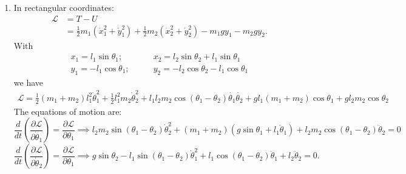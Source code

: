 \documentclass{article}
\theoremstyle{definition}
\newcommand{\p}{\partial}
\newcommand{\lag}{\mathcal{L}}
\newcommand{\f}[2]{\frac{#1}{#2}}
\newcommand{\lp}{\left(}
\newcommand{\rp}{\right)}
\begin{document}
\begin{enumerate}[label=(\alph*)]
	\item In rectangular coordinates:
	\begin{align*}
	\lag 
	&= T - U \\
	&= \f{1}{2}m_1(\dot{x}_1^2 + \dot{y}_1^2) + \f{1}{2}m_2(\dot{x}_2^2 + \dot{y}_2^2) - m_1gy_1 - m_2 g y_2.
	\end{align*}
	With 
	\begin{align*}
	x_1 = l_1 \sin\theta_1; &\quad\quad x_2 = l_2 \sin\theta_2 + l_1 \sin\theta_1 \\
	y_1 = -l_1\cos\theta_1; &\quad\quad y_2 = -l_2\cos\theta_2 - l_1\cos\theta_1
	\end{align*}
	we have
	\begin{align*}
	\boxed{\lag = \f{1}{2}(m_1+m_2) l_1^2\dot{\theta}_1^2  + \f{1}{2}l_1^2m_2\dot{\theta}_2^2 + l_1l_2m_2\cos(\theta_1 - \theta_2) \dot{\theta_1}\dot{\theta_2} + gl_1(m_1+m_2)\cos\theta_1 + gl_2m_2\cos\theta_2}
	\end{align*}
	The equations of motion are:
	\begin{equation*}
	\f{d}{dt}\lp \f{\p \lag}{\p \dot{\theta}_1} \rp = \f{\p \lag}{\p \theta_1} 
	\implies 
	l_2m_2\sin(\theta_1 - \theta_2) \dot{\theta}_2^2 + (m_1+m_2)(g\sin\theta_1 + l_1 \ddot{\theta}_1) + l_2m_2\cos(\theta_1 - \theta_2)\ddot{\theta}_2 = 0
	\end{equation*}
	\begin{equation*}
	\f{d}{dt}\lp \f{\p \lag}{\p \dot{\theta}_2} \rp = \f{\p \lag}{\p \theta_1}
	\implies 
	g\sin\theta_2 - l_1\sin(\theta_1 - \theta_2)\dot{\theta}_1^2 + l_1\cos(\theta_1-\theta_2) \ddot{\theta}_1 + l_2 \ddot{\theta}_2 = 0.
	\end{equation*}
	

\end{enumerate}
\end{document}
